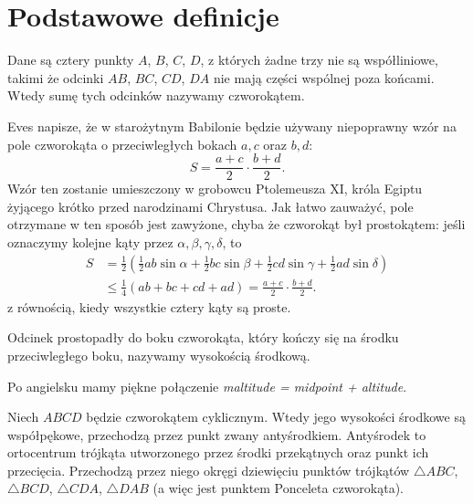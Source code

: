 %

\section{Podstawowe definicje}

\begin{definition}[czworokąt]
%
	Dane są cztery punkty $A$, $B$, $C$, $D$, z których żadne trzy nie są współliniowe, takimi że odcinki $AB$, $BC$, $CD$, $DA$ nie mają części wspólnej poza końcami.
    Wtedy sumę tych odcinków nazywamy czworokątem.	
\end{definition}



Eves \cite[s.4]{eves_1963} napisze, że w starożytnym Babilonie będzie używany niepoprawny wzór na pole czworokąta o przeciwległych bokach $a, c$ oraz $b, d$:
\begin{equation}
	S = \frac{a + c}{2} \cdot \frac{b + d}{2}.
\end{equation}
Wzór ten zostanie umieszczony w grobowcu Ptolemeusza XI, króla Egiptu żyjącego krótko przed narodzinami Chrystusa.
Jak łatwo zauważyć, pole otrzymane w ten sposób jest zawyżone, chyba że czworokąt był prostokątem: jeśli oznaczymy kolejne kąty przez $\alpha, \beta, \gamma, \delta$, to 
\begin{align}
	S & = \frac 1 2 \left(\frac 1 2 ab \sin \alpha + \frac 1 2 bc \sin \beta + \frac 1 2 cd \sin \gamma + \frac 1 2 ad \sin \delta\right) \\
	& \le \frac 1 4 (ab + bc + cd + ad) = \frac{a + c}{2} \cdot \frac{b + d}{2}.
\end{align}
z równością, kiedy wszystkie cztery kąty są proste.


\begin{definition}
	Odcinek prostopadły do boku czworokąta, który kończy się na środku przeciwległego boku, nazywamy wysokością środkową.
\end{definition}

Po angielsku mamy piękne połączenie \emph{maltitude = midpoint + altitude}.

\begin{proposition} %
	Niech $ABCD$ będzie czworokątem cyklicznym.
	Wtedy jego wysokości środkowe są współpękowe, przechodzą przez punkt zwany antyśrodkiem.
%
	Antyśrodek to ortocentrum trójkąta utworzonego przez środki przekątnych oraz punkt ich przecięcia.
	Przechodzą przez niego okręgi dziewięciu punktów trójkątów $\triangle ABC$, $\triangle BCD$, $\triangle CDA$, $\triangle DAB$ (a więc jest punktem Ponceleta czworokąta).
\end{proposition}

